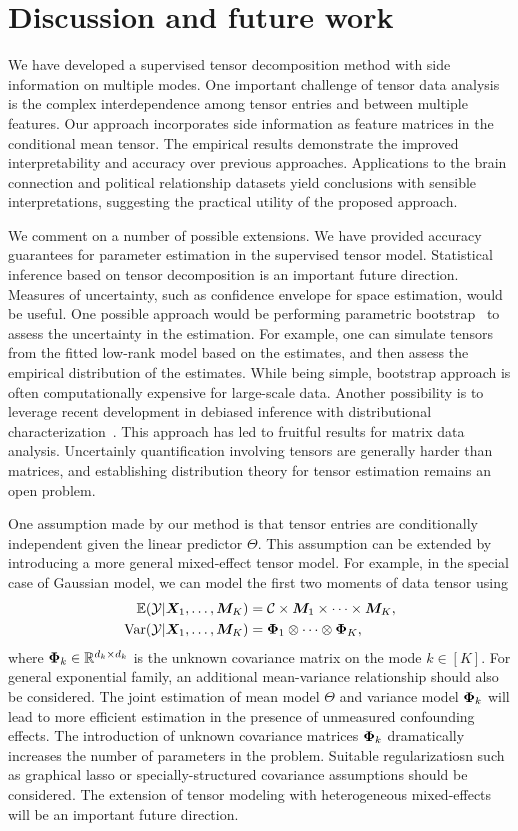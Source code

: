 \documentclass[12pt]{article}
\theoremstyle{definition}
\theoremstyle{definition}
\begin{document}
\section{Discussion and future work}\label{sec:con}
We have developed a supervised tensor decomposition method with side information on multiple modes. One important challenge of tensor data analysis is the complex interdependence among tensor entries and between multiple features. Our approach incorporates side information as feature matrices in the conditional mean tensor. The empirical results demonstrate the improved interpretability and accuracy over previous approaches. Applications to the brain connection and political relationship datasets yield conclusions with sensible interpretations, suggesting the practical utility of the proposed approach.
 
We comment on a number of possible extensions. We have provided accuracy guarantees for parameter estimation in the supervised tensor model. Statistical inference based on tensor decomposition is an important future direction. Measures of uncertainty, such as confidence envelope for space estimation, would be useful. One possible approach would be performing parametric bootstrap~\citep{efron1994boot} to assess the uncertainty in the estimation. For example, one can simulate tensors from the fitted low-rank model based on the estimates, and then assess the empirical distribution of the estimates. While being simple, bootstrap approach is often computationally expensive for large-scale data. Another possibility is to leverage recent development in debiased inference with distributional characterization~\citep{chen2019inference,xia2019confidence}. This approach has led to fruitful results for matrix data analysis. Uncertainly quantification involving tensors are generally harder than matrices, and establishing distribution theory for tensor estimation remains an open problem.

One assumption made by our method is that tensor entries are conditionally independent given the linear predictor $\Theta$. This assumption can be extended by introducing a more general mixed-effect tensor model. For example, in the special case of Gaussian model, we can model the first two moments of data tensor using
\begin{align}\label{eq:extention}
\mathbb{E}(\mathcal{Y}|\bm X_1,\ldots,\bm M_K)&=\mathcal{C}\times\bm M_1\times \cdots \times \bm M_K, \notag \\
\text{Var}(\mathcal{Y}|\bm X_1,\ldots,\bm M_K)&=\bm{\Phi}_1\otimes \cdots \otimes \bm{\Phi}_K,
\end{align}
where $\bm{\Phi}_k\in\mathbb{R}^{d_k\times d_k}$ is the unknown covariance matrix on the mode $k\in[K]$. For general exponential family, an additional mean-variance relationship should also be considered. The joint estimation of mean model $\Theta$ and variance model $\bm{\Phi}_k$ will lead to more efficient estimation in the presence of unmeasured confounding effects. The introduction of unknown covariance matrices $\bm{\Phi}_k$ dramatically increases the number of parameters in the problem. Suitable regularizatiosn such as graphical lasso or specially-structured covariance assumptions should be considered. The extension of tensor modeling with heterogeneous mixed-effects will be an important future direction. 
\end{document}
